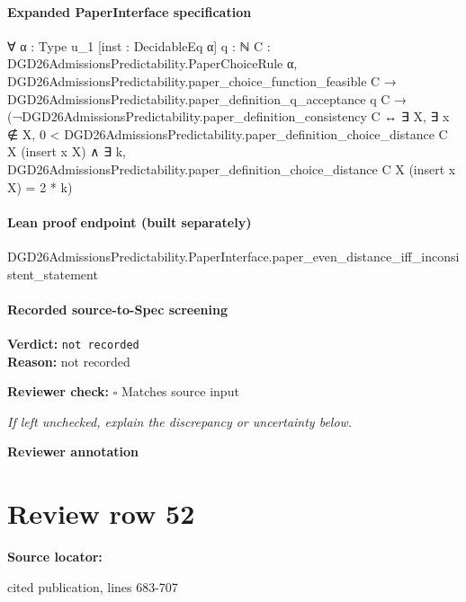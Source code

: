 \documentclass[10pt]{article}
\newcommand{\reviewerbox}{%
  \par\noindent\fbox{\parbox{0.96\linewidth}{\rule{0pt}{0.38in}}}\par
}
\newcommand{\reviewmatch}[1]{%
  \par\noindent\textbf{Reviewer check:} $\square$\; #1\par
  \noindent\emph{If left unchecked, explain the discrepancy or uncertainty below.}\par
}
\begin{document}
\paragraph{Expanded PaperInterface specification}
\begin{ReviewVerbatim}
∀ {α : Type u_1} [inst : DecidableEq α] {q : ℕ} {C : DGD26AdmissionsPredictability.PaperChoiceRule α},
  DGD26AdmissionsPredictability.paper_choice_function_feasible C →
    DGD26AdmissionsPredictability.paper_definition_q_acceptance q C →
      (¬DGD26AdmissionsPredictability.paper_definition_consistency C ↔
        ∃ X,
          ∃ x ∉ X,
            0 < DGD26AdmissionsPredictability.paper_definition_choice_distance C X (insert x X) ∧
              ∃ k, DGD26AdmissionsPredictability.paper_definition_choice_distance C X (insert x X) = 2 * k)
\end{ReviewVerbatim}

\paragraph{Lean proof endpoint (built separately)}\begin{ReviewVerbatim}
DGD26AdmissionsPredictability.PaperInterface.paper_even_distance_iff_inconsistent_statement
\end{ReviewVerbatim}

\paragraph{Recorded source-to-Spec screening}
\textbf{Verdict:} \texttt{not recorded}
\\
\textbf{Reason:} not recorded
\reviewmatch{Matches source input}
\noindent\textbf{Reviewer annotation}\par
\reviewerbox
\clearpage
\hypertarget{source-claim-3e732abc6f7366e9}{}
\section*{Review row 52}
\textbf{Source locator:} {\footnotesize\raggedright cited publication, lines 683-\allowbreak{}707\par}
\end{document}
